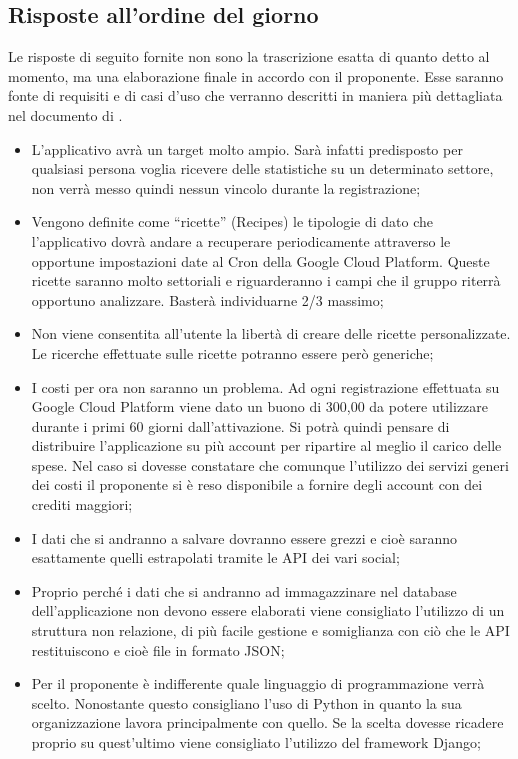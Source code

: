 	\subsection{Risposte all'ordine del giorno} %
	\label{sub:risposte_all_ordine_del_giorno}
	Le risposte di seguito fornite non sono la trascrizione esatta di quanto detto al momento, ma una elaborazione finale in accordo con il proponente. \newline
	Esse saranno fonte di requisiti e di casi d'uso che verranno descritti in maniera più dettagliata nel documento di \docNameVersionAdR.
		\begin{itemize}
			\item L'applicativo avrà un target molto ampio. Sarà infatti predisposto per qualsiasi persona voglia ricevere delle statistiche su un determinato settore, non verrà messo quindi nessun vincolo durante la registrazione;
			\item Vengono definite come ``ricette'' (Recipes) le tipologie di dato che l'applicativo dovrà andare a recuperare periodicamente attraverso le opportune impostazioni date al Cron della Google Cloud Platform. Queste ricette saranno molto settoriali e riguarderanno i campi che il gruppo riterrà opportuno analizzare. Basterà individuarne 2/3 massimo;
			\item Non viene consentita all'utente la libertà di creare delle ricette personalizzate. Le ricerche effettuate sulle ricette potranno essere però generiche;
			\item I costi per ora non saranno un problema. Ad ogni registrazione effettuata su Google Cloud Platform viene dato un buono di \textdollar{} 300,00 da potere utilizzare durante i primi 60 giorni dall'attivazione. Si potrà quindi pensare di distribuire l'applicazione su più account per ripartire al meglio il carico delle spese. Nel caso si dovesse constatare che comunque l'utilizzo dei servizi generi dei costi il proponente si è reso disponibile a fornire degli account con dei crediti maggiori;
			\item I dati che si andranno a salvare dovranno essere grezzi e cioè saranno esattamente quelli estrapolati tramite le API dei vari social;
			\item Proprio perché i dati che si andranno ad immagazzinare nel database dell'applicazione non devono essere elaborati viene consigliato l'utilizzo di un struttura non relazione, di più facile gestione e somiglianza con ciò che le API restituiscono e cioè file in formato JSON;
			\item Per il proponente è indifferente quale linguaggio di programmazione verrà scelto. Nonostante questo consigliano l'uso di Python in quanto la sua organizzazione lavora principalmente con quello. Se la scelta dovesse ricadere proprio su quest'ultimo viene consigliato l'utilizzo del framework Django;

\end{itemize}
